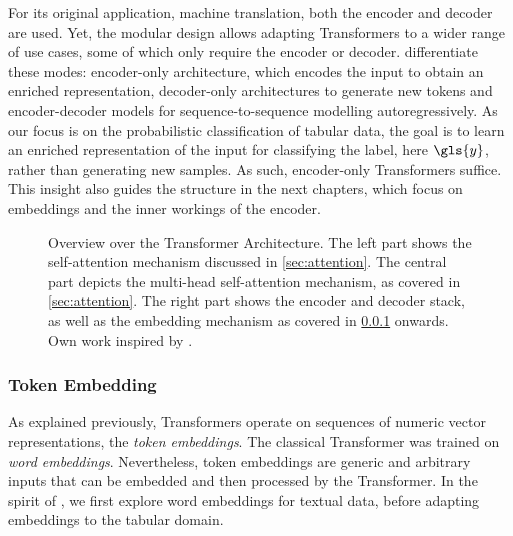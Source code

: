 For its original application, machine translation, both the encoder and decoder are used. Yet, the modular design allows adapting Transformers to a wider range of use cases, some of which only require the encoder or decoder. \textcite[][16--17]{raffelExploringLimitsTransfer2020} differentiate these modes: encoder-only architecture, which encodes the input to obtain an enriched representation, decoder-only architectures to generate new \glspl{token} and encoder-decoder models for sequence-to-sequence modelling autoregressively. As our focus is on the probabilistic classification of tabular data, the goal is to learn an enriched representation of the input for classifying the label, here $\gls{y}$, rather than generating new samples. As such, encoder-only Transformers suffice. This insight also guides the structure in the next chapters, which focus on \glspl{embedding} and the inner workings of the encoder.
\begin{landscape}
    \begin{figure}[ht]
        \centering
        {\renewcommand\normalsize{\scriptsize}%
            \normalsize
            }
        \caption[Overview Over the Transformer Architecture]{Overview over the Transformer Architecture. The left part shows the self-attention mechanism discussed in \cref{sec:attention}. The central part depicts the multi-head self-attention mechanism, as covered in \cref{sec:attention}. The right part shows the encoder and decoder stack, as well as the \gls{embedding} mechanism as covered in \cref{sec:token-embeddings} onwards. Own work inspired by \textcite[][3]{tayEfficientTransformersSurvey2022}.}
        \label{fig:transformer-architecture-overview}
    \end{figure}
\end{landscape}

\subsubsection{Token Embedding}\label{sec:token-embeddings}

As explained previously, Transformers operate on sequences of numeric vector representations, the \emph{token embeddings}. The classical Transformer was trained on \emph{word embeddings}. Nevertheless, \gls{token} embeddings are generic and arbitrary inputs that can be embedded and then processed by the Transformer. In the spirit of \textcite[][5]{vaswaniAttentionAllYou2017}, we first explore word embeddings for textual data, before adapting embeddings to the tabular domain.

